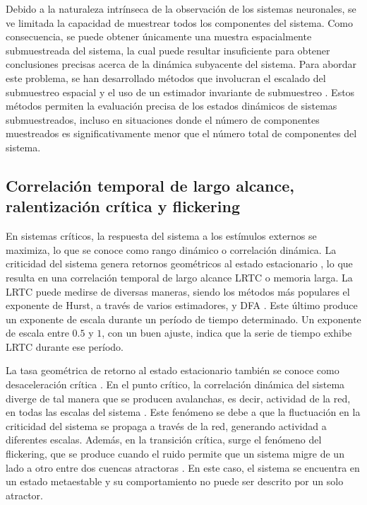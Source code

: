 Debido a la naturaleza intrínseca de la observación de los sistemas neuronales, se ve limitada la capacidad de muestrear todos los componentes del sistema. Como consecuencia, se puede obtener únicamente una muestra espacialmente submuestreada del sistema, la cual puede resultar insuficiente para obtener conclusiones precisas acerca de la dinámica subyacente del sistema. Para abordar este problema, se han desarrollado métodos que involucran el escalado del submuestreo espacial \cite{levina_subsampling_2017} y el uso de un estimador invariante de submuestreo \cite{wilting_inferring_2018}. Estos métodos permiten la evaluación precisa de los estados dinámicos de sistemas submuestreados, incluso en situaciones donde el número de componentes muestreados es significativamente menor que el número total de componentes del sistema.



\subsection{Correlación temporal de largo alcance, ralentización crítica y flickering}


En sistemas críticos, la respuesta del sistema a los estímulos externos se maximiza, lo que se conoce como rango dinámico o correlación dinámica. La criticidad del sistema genera retornos geométricos al estado estacionario \cite{hesse_self-organized_2014}, lo que resulta en una correlación temporal de largo alcance \gls{LRTC} o memoria larga. La \gls{LRTC} puede medirse de diversas maneras, siendo los métodos más populares el exponente de Hurst, a través de varios estimadores, y   \gls{DFA}  \cite{hardstone_detrended_2012}. Este último produce un exponente de escala durante un período de tiempo determinado. Un exponente de escala entre $0.5$ y $1$, con un buen ajuste, indica que la serie de tiempo exhibe \gls{LRTC} durante ese período.

La tasa geométrica de retorno al estado estacionario también se conoce como desaceleración crítica \cite{scheffer_early-warning_2009}. En el punto crítico, la correlación dinámica del sistema diverge de tal manera que se producen avalanchas, es decir, actividad de la red, en todas las escalas del sistema \cite{hesse_self-organized_2014}. Este fenómeno se debe a que la fluctuación en la criticidad del sistema se propaga a través de la red, generando actividad a diferentes escalas. Además, en la transición crítica, surge el fenómeno del flickering, que se produce cuando el ruido permite que un sistema migre de un lado a otro entre dos cuencas atractoras \cite{wang_flickering_2012}. En este caso, el sistema se encuentra en un estado metaestable y su comportamiento no puede ser descrito por un solo atractor.




